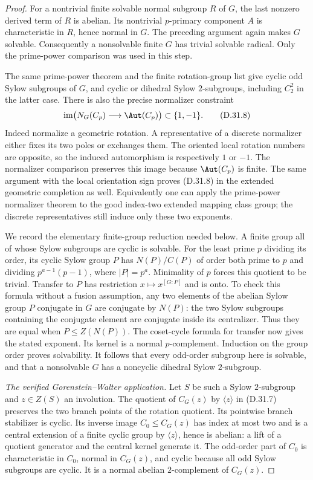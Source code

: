 \begin{proof}
For a nontrivial finite solvable normal subgroup $R$ of $G$, the
last nonzero derived term of $R$ is abelian. Its nontrivial
$p$-primary component $A$ is characteristic in $R$, hence normal
in $G$. The preceding argument again makes $G$ solvable.
Consequently a nonsolvable finite $G$ has trivial solvable radical.
Only the prime-power comparison was used in this step.

The same prime-power theorem and the finite rotation-group list
give cyclic odd Sylow subgroups of $G$, and cyclic or dihedral
Sylow $2$-subgroups, including $C_2^2$ in the latter case.
There is also the precise normalizer constraint
\[
 \operatorname{im}\bigl(N_G(C_p)\longrightarrow\Aut(C_p)\bigr)
                      \subset\{1,-1\}.               \tag{D.31.8}
\]
Indeed normalize a geometric rotation. A representative of a
discrete normalizer either fixes its two poles or exchanges them.
The oriented local rotation numbers are opposite, so the induced
automorphism is respectively $1$ or $-1$. The normalizer comparison
preserves this image because $\Aut(C_p)$ is finite. The same
argument with the local orientation sign proves (D.31.8) in the
extended geometric completion as well. Equivalently one can apply
the prime-power normalizer theorem to the good index-two extended
mapping class group; the discrete representatives still induce
only these two exponents.

We record the elementary finite-group reduction needed below.
A finite group all of whose Sylow subgroups are cyclic is solvable.
For the least prime $p$ dividing its order, its cyclic Sylow group
$P$ has $N(P)/C(P)$ of order both prime to $p$ and dividing
$p^{a-1}(p-1)$, where $|P|=p^a$. Minimality of $p$ forces this
quotient to be trivial. Transfer to $P$ has restriction
$x\mapsto x^{[G:P]}$ and is onto. To check this formula without
a fusion assumption, any two elements of the abelian Sylow group
$P$ conjugate in $G$ are conjugate by $N(P)$: the two Sylow
subgroups containing the conjugate element are conjugate inside
its centralizer. Thus they are equal when $P\leq Z(N(P))$.
The coset-cycle formula for transfer now gives the stated exponent.
Its kernel is a normal $p$-complement. Induction on the group order
proves solvability. It follows that every odd-order subgroup here
is solvable, and that a nonsolvable $G$ has a noncyclic dihedral
Sylow $2$-subgroup.

\emph{The verified Gorenstein--Walter application.}
Let $S$ be such a Sylow $2$-subgroup and $z\in Z(S)$ an involution.
The quotient of $C_G(z)$ by $\langle z\rangle$ in (D.31.7)
preserves the two branch points of the rotation quotient.
Its pointwise branch stabilizer is cyclic. Its inverse image
$C_0\leq C_G(z)$ has index at most two and is a central extension
of a finite cyclic group by $\langle z\rangle$, hence is abelian:
a lift of a quotient generator and the central kernel generate it.
The odd-order part of $C_0$ is characteristic in $C_0$, normal in
$C_G(z)$, and cyclic because all odd Sylow subgroups are cyclic.
It is a normal abelian $2$-complement of $C_G(z)$.


\end{proof}

